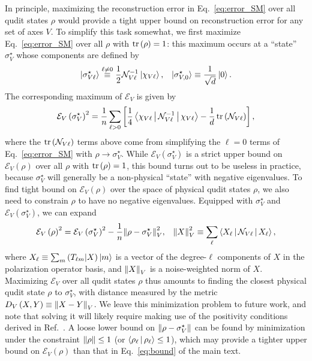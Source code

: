 \documentclass[notitlepage,twocolumn]{revtex4-2}
\newcommand{\f}[2]{\dfrac{#1}{#2}} %
\newcommand{\p}[1]{\left(#1\right)} %
\renewcommand{\sp}[1]{\left[#1\right]} %
\newcommand{\bk}{\Braket} %
\newcommand{\E}{\mathcal{E}}
\newcommand{\N}{\mathcal{N}}
\def\obk#1{\mathinner{({#1})}}
\begin{document}
In principle, maximizing the reconstruction error in Eq.~\eqref{eq:error_SM} over all qudit states $\rho$ would provide a tight upper bound on reconstruction error for any set of axes $V$.
To simplify this task somewhat, we first maximize Eq.~\eqref{eq:error_SM} over all $\rho$ with $\tr\p\rho=1$: this maximum occurs at a ``state'' $\sigma_V^\star$ whose components are defined by
\begin{align}
  \ket{\sigma_{V\ell}^\star} \stackrel{\ell\ne0}{\equiv}
  \f12 \N_{V\ell}^{-1} \ket{\chi_{V\ell}},
  &&
  \ket{\sigma_{V,0}^\star} \equiv \f1{\sqrt{d}} \ket{0}.
\end{align}
The corresponding maximum of $\E_V$ is given by
\begin{align}
  \E_V\p{\sigma_V^\star}^2 = \f1n \sum_{\ell>0}
  \sp{\f14 \bk{\chi_{V\ell}|\N_{V\ell}^{-1}|\chi_{V\ell}}
  - \f1d \tr\p{\N_{V\ell}}},
\end{align}
where the $\tr\p{\N_{V\ell}}$ terms above come from simplifying the $\ell=0$ terms of Eq.~\eqref{eq:error_SM} with $\rho\to\sigma_V^\star$.
While $\E_V\p{\sigma_V^\star}$ is a strict upper bound on $\E_V\p{\rho}$ over all $\rho$ with $\tr\p{\rho}=1$, this bound turns out to be useless in practice, because $\sigma_V^\star$ will generally be a non-physical ``state'' with negative eigenvalues.
To find tight bound on $\E_V\p{\rho}$ over the space of physical qudit states $\rho$, we also need to constrain $\rho$ to have no negative eigenvalues.
Equipped with $\sigma_V^\star$ and $\E_V\p{\sigma_V^\star}$, we can expand
\begin{align}
  \E_V\p{\rho}^2 = \E_V\p{\sigma_V^\star}^2
  - \f1n \norm{\rho-\sigma_V^\star}_V^2,
  &&
  \norm{X}_V^2 \equiv \sum_\ell \bk{X_\ell|\N_{V\ell}|X_\ell},
\end{align}
where $X_\ell\equiv\sum_m\obk{T_{\ell m}|X}\ket{m}$ is a vector of the degree-$\ell$ components of $X$ in the polarization operator basis, and $\norm{X}_V$ is a noise-weighted norm of $X$.
Maximizing $\E_V$ over all qudit states $\rho$ thus amounts to finding the closest physical qudit state $\rho$ to $\sigma_V^\star$, with distance measured by the metric $D_V\p{X,Y}\equiv\norm{X-Y}_V$.
We leave this minimization problem to future work, and note that solving it will likely require making use of the positivity conditions derived in Ref.~\cite{kryszewski2006positivity}.
A loose lower bound on $\norm{\rho-\sigma_V^\star}$ can be found by minimization under the constraint $\norm{\rho}\le1$ (or $\bk{\rho_\ell|\rho_\ell}\le1$), which may provide a tighter upper bound on $\E_V\p{\rho}$ than that in Eq.~\eqref{eq:bound} of the main text.
\end{document}
